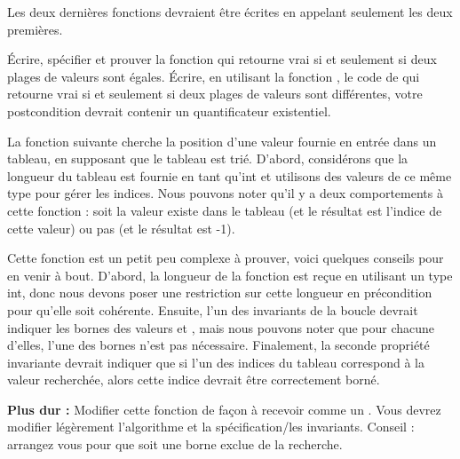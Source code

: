 Les deux dernières fonctions devraient être écrites en appelant seulement les deux
premières.





Écrire, spécifier et prouver la fonction  qui retourne vrai
si et seulement si deux plages de valeurs sont égales. Écrire, en utilisant la
fonction , le code de  qui retourne vrai
si et seulement si deux plages de valeurs sont différentes, votre postcondition
devrait contenir un quantificateur existentiel.





\label{l4:statements-loops-ex-bsearch}


La fonction suivante cherche la position d'une valeur fournie en entrée dans
un tableau, en supposant que le tableau est trié. D'abord, considérons que la
longueur du tableau est fournie en tant qu'int et utilisons des valeurs de ce
même type pour gérer les indices. Nous pouvons noter qu'il y a deux comportements
à cette fonction : soit la valeur existe dans le tableau (et le résultat est 
l'indice de cette valeur) ou pas (et le résultat est -1).
 
 


Cette fonction est un petit peu complexe à prouver, voici quelques conseils
pour en venir à bout. D'abord, la longueur de la fonction est reçue en utilisant
un type int, donc nous devons poser une restriction sur cette longueur en 
précondition pour qu'elle soit cohérente. Ensuite, l'un des invariants de la
boucle devrait indiquer les bornes des valeurs  et 
, mais nous pouvons noter que pour chacune d'elles, l'une des
bornes n'est pas nécessaire. Finalement, la seconde propriété invariante 
devrait indiquer que si l'un des indices du tableau correspond à la valeur
recherchée, alors cette indice devrait être correctement borné.

\textbf{Plus dur :} Modifier cette fonction de façon à recevoir 
comme un . Vous devrez modifier légèrement l'algorithme et 
la spécification/les invariants. Conseil : arrangez vous pour que 
soit une borne exclue de la recherche.




